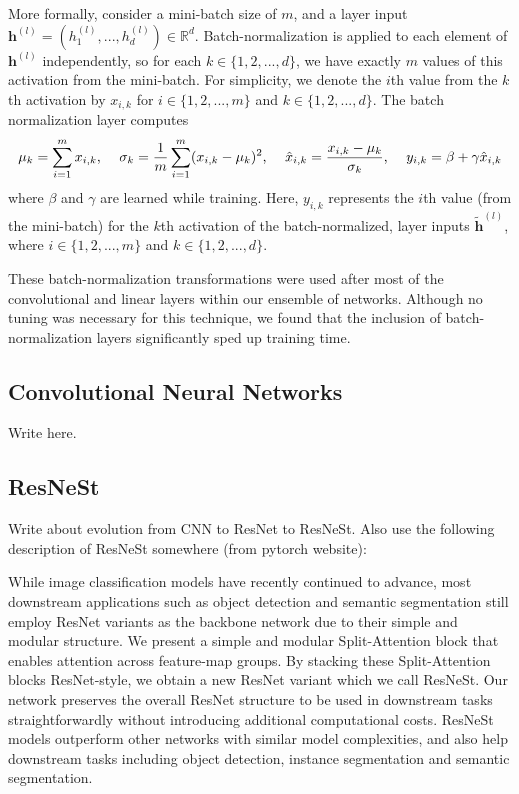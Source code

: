 \documentclass [MAS] {uclathes}
\begin{document}
More formally, consider a mini-batch size of $m$, and a layer input $\mathbf{h}^{(l)} = (h^{(l)}_1, ..., h^{(l)}_d) \in \mathbb{R}^d$. Batch-normalization is applied to each element of $\mathbf{h}^{(l)}$ independently, so for each $k \in \{1, 2, ..., d \}$, we have exactly $m$ values of this activation from the mini-batch. For simplicity, we denote the $i$th value from the $k$th activation by $x_{i,k}$ for $i \in \{1, 2, ..., m \}$ and $k \in \{1, 2, ..., d \}$. The batch normalization layer computes $$\mu_k = \sum_{i=1}^{m} x_{i, k} \text{, \quad} \sigma_k = \frac{1}{m} \sum_{i=1}^{m} (x_{i, k} - \mu_k)^2 \text{, \quad} \hat{x}_{i,k} = \frac{x_{i,k} - \mu_k}{\sigma_k} \text{, \quad} y_{i, k} = \beta + \gamma \hat{x}_{i,k}$$ where $\beta$ and $\gamma$ are learned while training. Here, $y_{i, k}$ represents the $i$th value (from the mini-batch) for the $k$th activation of the batch-normalized, layer inputs $\tilde{\mathbf{h}}^{(l)}$, where $i \in \{1, 2, ..., m \}$ and $k \in \{1, 2, ..., d \}$.

These batch-normalization transformations were used after most of the convolutional and linear layers within our ensemble of networks. Although no tuning was necessary for this technique, we found that the inclusion of batch-normalization layers significantly sped up training time.


\subsection{Convolutional Neural Networks}

Write here. 

\subsection{ResNeSt}

Write about evolution from CNN to ResNet to ResNeSt. Also use the following description of ResNeSt somewhere (from pytorch website):

While image classification models have recently continued to advance, most downstream applications such as object detection and semantic segmentation still employ ResNet variants as the backbone network due to their simple and modular structure. We present a simple and modular Split-Attention block that enables attention across feature-map groups. By stacking these Split-Attention blocks ResNet-style, we obtain a new ResNet variant which we call ResNeSt. Our network preserves the overall ResNet structure to be used in downstream tasks straightforwardly without introducing additional computational costs. ResNeSt models outperform other networks with similar model complexities, and also help downstream tasks including object detection, instance segmentation and semantic segmentation.
\end{document}
